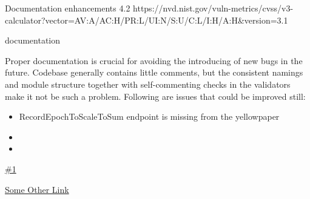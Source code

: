 \vuln
    { %
      Documentation enhancements
    }
    { %
      4.2
    }
    { %
      https://nvd.nist.gov/vuln-metrics/cvss/v3-calculator?vector=AV:A/AC:H/PR:L/UI:N/S:U/C:L/I:H/A:H&version=3.1
    }
    { %
    \item documentation
    }
    { %
    Proper documentation is crucial for avoiding the introducing of new bugs in the future.
Codebase generally contains little comments, but the consistent namings and module structure together with self-commenting checks in the validators make it not be such a problem.
Following are issues that could be improved still:
\begin{itemize}
    \item RecordEpochToScaleToSum endpoint is missing from the yellowpaper
    \item 
    \item 
  \end{itemize}
  
    }
    { %
      
    }
    { %
    \item\href{github.com}{\#1}
    \item\href{github.com}{Some Other Link}
    }
